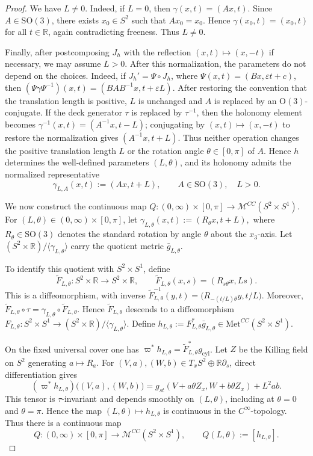 \documentclass[12pt,oneside,a4paper]{article}
\theoremstyle{mytheorem}
\theoremstyle{remark}
\theoremstyle{definition}
\begin{document}
\begin{proof}
We have \(L\neq 0\). Indeed, if \(L=0\), then $\gamma(x,t)=(Ax,t).$
Since \(A\in \mathrm{SO}(3)\), there exists \(x_0\in S^2\) such that \(Ax_0=x_0\). Hence
$\gamma(x_0,t)=(x_0,t)$ for all $t\in \mathbb R$, again contradicting freeness. Thus \(L\neq 0\).

Finally, after postcomposing $J_h$ with the reflection
$(x,t)\mapsto(x,-t)$ if necessary, we may assume $L>0$. After this
normalization, the parameters do not depend on the choices. Indeed, if
$J_h'=\Psi\circ J_h$, where
$\Psi(x,t)=(Bx,\varepsilon t+c)$, then
\((\Psi\gamma\Psi^{-1})(x,t)
=(BAB^{-1}x,t+\varepsilon L)\).
After restoring the convention that the translation length is positive,
$L$ is unchanged and $A$ is replaced by an $\mathrm O(3)$-conjugate. If the
deck generator $\tau$ is replaced by $\tau^{-1}$, then the holonomy element becomes
$\gamma^{-1}(x,t)=(A^{-1}x,t-L)$; conjugating by $(x,t)\mapsto(x,-t)$ to
restore the normalization gives $(A^{-1}x,t+L)$. Thus neither operation
changes the positive translation length $L$ or the rotation angle
$\theta\in[0,\pi]$ of $A$. Hence
$h$ determines the well-defined parameters $(L,\theta)$, and its holonomy
admits the normalized representative
\[
\gamma_{L,A}(x,t):=(Ax,t+L),
\qquad
A\in \mathrm{SO}(3),\quad L>0.
\]

We now construct the continuous map
$Q\colon (0,\infty) \times [0,\pi] \to \mathcal{M}^{CC}(S^2 \times S^1)$.
For \((L,\theta)\in (0,\infty)\times[0,\pi]\), let
\(
\gamma_{L,\theta}(x,t):=(R_\theta x,t+L),
\)
where \(R_\theta\in\mathrm{SO}(3)\) denotes the standard rotation by angle \(\theta\) about the \(x_3\)-axis. Let
$(S^2\times \mathbb R)/\langle \gamma_{L,\theta}\rangle$
carry the quotient metric \(\bar g_{L,\theta}\).

To identify this quotient with \(S^2\times S^1\), define
\[
\widetilde F_{L,\theta}\colon S^2\times \mathbb R\longrightarrow S^2\times \mathbb R,
\qquad
\widetilde F_{L,\theta}(x,s)=(R_{s\theta}x,Ls).
\]
This is a diffeomorphism, with inverse
\(\widetilde F_{L,\theta}^{-1}(y,t)=\bigl(R_{-(t/L)\theta}y,t/L\bigr)\).
Moreover,
\(\widetilde F_{L,\theta}\circ \tau=\gamma_{L,\theta}\circ \widetilde F_{L,\theta}\).
Hence \(\widetilde F_{L,\theta}\) descends to a diffeomorphism
\(F_{L,\theta}\colon S^2\times S^1\to
(S^2\times \mathbb R)/\langle \gamma_{L,\theta}\rangle\).
Define
\(h_{L,\theta}:=F_{L,\theta}^*\bar g_{L,\theta}\in \mathrm{Met}^{CC}(S^2\times S^1)\).

On the fixed universal cover one has
\(\varpi^*h_{L,\theta}=\widetilde F_{L,\theta}^*g_{\mathrm{cyl}}\).
Let $Z$ be the Killing field on $S^2$ generating $a\mapsto R_a$. For
$(V,a),(W,b)\in T_xS^2\oplus\mathbb R\partial_s$, direct differentiation
gives
\[
(\varpi^*h_{L,\theta})\bigl((V,a),(W,b)\bigr)
=g_{st}(V+a\theta Z_x,W+b\theta Z_x)+L^2ab.
\]
This tensor is $\tau$-invariant and depends smoothly on $(L,\theta)$,
including at $\theta=0$ and $\theta=\pi$. Hence the map
$(L,\theta)\longmapsto h_{L,\theta}$
is continuous in the \(C^\infty\)-topology. Thus there is a continuous map
\[
Q\colon(0,\infty)\times[0,\pi]\longrightarrow \mathcal{M}^{CC}(S^2\times S^1),
\qquad
Q(L,\theta):=[h_{L,\theta}].
\]



\end{proof}
\end{document}
